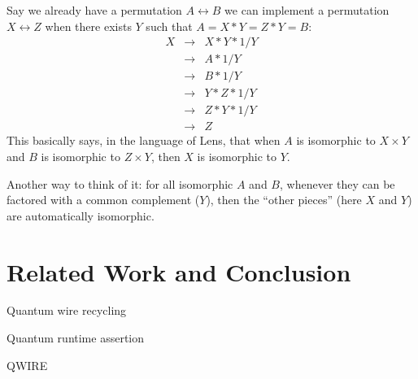 \documentclass[sigplan,10pt,review,anonymous]{acmart}
\begin{document}
Say we already have a permutation $A \leftrightarrow B$
we can implement a permutation $X \leftrightarrow Z$ 
when there exists $Y$ such that $A = X * Y = Z * Y = B$:
\[\begin{array}{rcl}
X &\rightarrow& X * Y * 1/Y \\
  &\rightarrow& A * 1/Y \\
  &\rightarrow&  B * 1/Y \\
  &\rightarrow&  Y * Z * 1/Y \\
  &\rightarrow&  Z * Y * 1/Y \\
  &\rightarrow&  Z
\end{array}\]
This basically says, in the language of Lens, that
when $A$ is isomorphic to $X \times Y$ and
$B$ is isomorphic to $Z \times Y$, then
$X$ is isomorphic to $Y$.

Another way to think of it: for all isomorphic
$A$ and $B$, whenever they can be factored with a
common complement ($Y$), then the ``other pieces''
(here $X$ and $Y$) are automatically isomorphic.

\section{Related Work and Conclusion}

Quantum wire recycling~\cite{PhysRevA.94.042337}

Quantum runtime assertion~\cite{DBLP:journals/cal/ZhouB19}

QWIRE~\cite{Paykin:2017:QCL:3009837.3009894}




\end{document}
